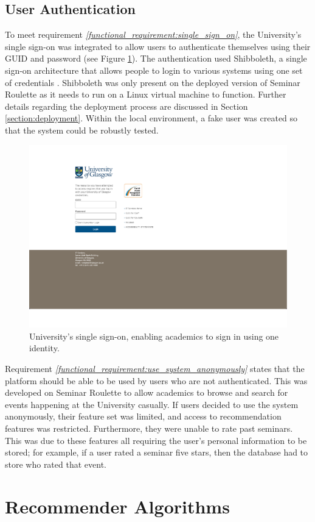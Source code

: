 \documentclass{l4proj}
\begin{document}
\subsection{User Authentication}

To meet requirement \emph{\ref{functional_requirement:single_sign_on}}, the University's single sign-on was integrated to allow users to authenticate themselves using their GUID and password (see Figure \ref{fig:shibboleth}). The authentication used Shibboleth, a single sign-on architecture that allows people to login to various systems using one set of credentials \citep{shibboleth}. Shibboleth was only present on the deployed version of Seminar Roulette as it needs to run on a Linux virtual machine to function. Further details regarding the deployment process are discussed in Section \ref{section:deployment}. Within the local environment, a fake user was created so that the system could be robustly tested.

\begin{figure}[htb]
    \centering
    \includegraphics[width=0.45\linewidth]{images/shibboleth.pdf}    
    \caption{University's single sign-on, enabling academics to sign in using one identity.}
    \label{fig:shibboleth} 
\end{figure}

Requirement \emph{\ref{functional_requirement:use_system_anonymously}} states that the platform should be able to be used by users who are not authenticated. This was developed on Seminar Roulette to allow academics to browse and search for events happening at the University casually. If users decided to use the system anonymously, their feature set was limited, and access to recommendation features was restricted. Furthermore, they were unable to rate past seminars. This was due to these features all requiring the user's personal information to be stored; for example, if a user rated a seminar five stars, then the database had to store who rated that event.

\section{Recommender Algorithms}
\label{section:recommender_algorithms}
\end{document}
